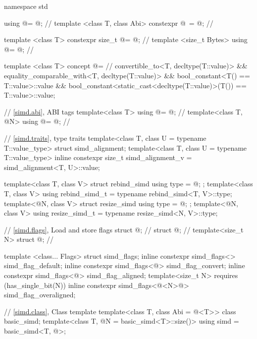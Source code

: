 \begin{codeblock}
namespace std {
  using @\simdsizetype@ = @\seebelow@; // \expos
  template <class T, class Abi> constexpr @\simdsizetype\ \simdsizev@ = @\seebelow@; // \expos

  template <class T> constexpr size_t @\maskelementsize@ = @\seebelow@; // \expos
  template <size_t Bytes> using @\integerfrom@ = @\seebelow@; // \expos

  template <class T>
    concept @\constexprwrapperlike@ =                     // \expos
      convertible_to<T, decltype(T::value)> &&
      equality_comparable_with<T, decltype(T::value)> &&
      bool_constant<T() == T::value>::value &&
      bool_constant<static_cast<decltype(T::value)>(T()) == T::value>::value;

  // \ref{simd.abi},  ABI tags
  template<class T> using @\nativeabi@ = @\seebelow@; // \expos
  template<class T, @\simdsizetype@ N> using @\deducet@ = @\seebelow@; // \expos

  // \ref{simd.traits},  type traits
  template<class T, class U = typename T::value_type> struct simd_alignment;
  template<class T, class U = typename T::value_type>
    inline constexpr size_t simd_alignment_v = simd_alignment<T, U>::value;

  template<class T, class V> struct rebind_simd { using type = @\seebelow@; };
  template<class T, class V> using rebind_simd_t = typename rebind_simd<T, V>::type;
  template<@\simdsizetype@ N, class V> struct resize_simd { using type = @\seebelow@; };
  template<@\simdsizetype@ N, class V> using resize_simd_t = typename resize_simd<N, V>::type;

  // \ref{simd.flags}, Load and store flags
  struct @\convertflag@ {}; // \expos
  struct @\alignedflag@ {}; // \expos
  template<size_t N> struct @\overalignedflag@ {}; // \expos

  template <class... Flags> struct simd_flags;
  inline constexpr simd_flags<> simd_flag_default{};
  inline constexpr simd_flags<@\convertflag@> simd_flag_convert{};
  inline constexpr simd_flags<@\alignedflag@> simd_flag_aligned{};
  template<size_t N> requires (has_single_bit(N))
    inline constexpr simd_flags<@\overalignedflag<N>@> simd_flag_overaligned{};

  // \ref{simd.class}, Class template 
  template<class T, class Abi = @\nativeabi@<T>> class basic_simd;
  template<class T, @\simdsizetype@ N = basic_simd<T>::size()>
    using simd = basic_simd<T, @>;

}
\end{codeblock}
